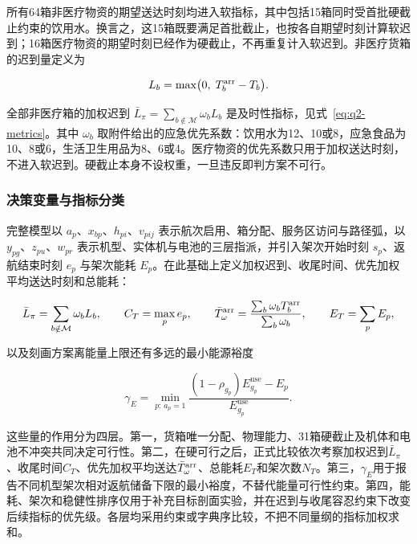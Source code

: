 所有64箱非医疗物资的期望送达时刻均进入软指标，其中包括15箱同时受首批硬截止约束的饮用水。换言之，这15箱既要满足首批截止，也按各自期望时刻计算软迟到；16箱医疗物资的期望时刻已经作为硬截止，不再重复计入软迟到。非医疗货箱的迟到量定义为

\begin{equation}
L_b=\max\bigl(0,\;T_b^{\rm arr}-T_b\bigr).
\label{eq:q2-late}
\end{equation}

全部非医疗箱的加权迟到 $\bar{L}_\pi=\sum_{b\notin\mathcal{M}}\omega_bL_b$ 是及时性指标，见式~\eqref{eq:q2-metrics}。其中 $\omega_b$ 取附件给出的应急优先系数：饮用水为12、10或8，应急食品为10、8或6，生活卫生用品为8、6或4。医疗物资的优先系数只用于加权送达时刻，不进入软迟到。硬截止本身不设权重，一旦违反即判方案不可行。

\subsubsection{决策变量与指标分类}

完整模型以 $a_p$、$x_{bp}$、$h_{pi}$、$v_{pij}$ 表示航次启用、箱分配、服务区访问与路径弧，以 $y_{pg}$、$z_{pu}$、$w_{pr}$ 表示机型、实体机与电池的三层指派，并引入架次开始时刻 $s_p$、返航结束时刻 $e_p$ 与架次能耗 $E_p$。在此基础上定义加权迟到、收尾时间、优先加权平均送达时刻和总能耗：

\begin{equation}
\bar{L}_\pi=\sum_{b\notin\mathcal{M}}\omega_bL_b,\qquad
C_T=\max_{p}e_p,\qquad
\bar{T}^{\rm arr}_\omega=\frac{\sum_b\omega_bT_b^{\rm arr}}{\sum_b\omega_b},\qquad
E_T=\sum_{p}E_p,
\label{eq:q2-metrics}
\end{equation}

以及刻画方案离能量上限还有多远的最小能源裕度

\begin{equation}
\gamma_E=\min_{p:\,a_p=1}\frac{(1-\rho_{g_p})E_{g_p}^{\mathrm{use}}-E_p}{E_{g_p}^{\mathrm{use}}}.
\label{eq:q2-margin}
\end{equation}

这些量的作用分为四层。第一，货箱唯一分配、物理能力、31箱硬截止及机体和电池不冲突共同决定可行性。第二，在硬可行之后，正式比较依次考察加权迟到$\bar{L}_\pi$、收尾时间$C_T$、优先加权平均送达$\bar{T}^{\rm arr}_\omega$、总能耗$E_T$和架次数$N_T$。第三，$\gamma_E$用于报告不同机型架次相对返航储备下限的最小裕度，不替代能量可行性约束。第四，能耗、架次和稳健性排序仅用于补充目标剖面实验，并在迟到与收尾容忍约束下改变后续指标的优先级。各层均采用约束或字典序比较，不把不同量纲的指标加权求和。

